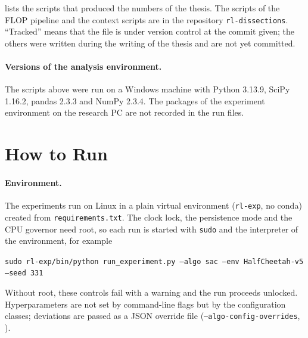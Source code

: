  lists the scripts that produced the numbers of the thesis.
The scripts of the FLOP pipeline and the context scripts are in the repository \texttt{rl-dissections}.
``Tracked'' means that the file is under version control at the commit given; the others were written during the writing of the thesis and are not yet committed.

\begin{table}[tbp]
  \centering
  \footnotesize
  \caption{Scripts behind the numbers of the thesis. Paths relative to the repository root.}
  \label{tab:app-repro-scripts}
\end{table}

\paragraph{Versions of the analysis environment.} The scripts above were run on a Windows machine with Python 3.13.9, SciPy 1.16.2, pandas 2.3.3 and NumPy 2.3.4.
The packages of the experiment environment on the research PC are not recorded in the run files.

\section{How to Run}\label{sec:app-repro-run}

\paragraph{Environment.} The experiments run on Linux in a plain virtual environment (\texttt{rl-exp}, no conda) created from \texttt{requirements.txt}.
The clock lock, the persistence mode and the CPU governor need root, so each run is started with \texttt{sudo} and the interpreter of the environment, for example
\begin{center}
  \texttt{sudo rl-exp/bin/python run\_experiment.py --algo sac --env HalfCheetah-v5 --seed 331}
\end{center}
Without root, these controls fail with a warning and the run proceeds unlocked.
Hyperparameters are not set by command-line flags but by the configuration classes; deviations are passed as a JSON override file (\texttt{--algo-config-overrides}, ).

